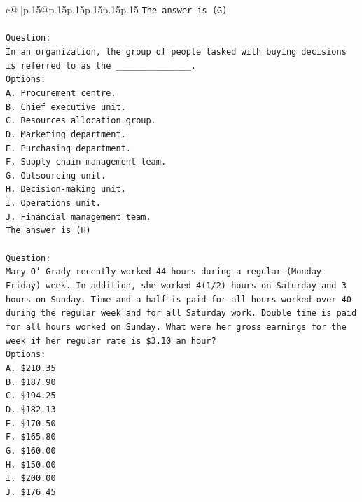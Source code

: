 \documentclass{article}
\begin{document}
{\begin{supertabular}{c@{$\;$}|p{.15\linewidth}@{}p{.15\linewidth}p{.15\linewidth}p{.15\linewidth}p{.15\linewidth}p{.15\linewidth}}
{{{\texttt{The answer is (G)} \\
\\ 
\texttt{Question:} \\
\texttt{In an organization, the group of people tasked with buying decisions is referred to as the \_\_\_\_\_\_\_\_\_\_\_\_\_\_\_.} \\
\texttt{Options:} \\
\texttt{A. Procurement centre.} \\
\texttt{B. Chief executive unit.} \\
\texttt{C. Resources allocation group.} \\
\texttt{D. Marketing department.} \\
\texttt{E. Purchasing department.} \\
\texttt{F. Supply chain management team.} \\
\texttt{G. Outsourcing unit.} \\
\texttt{H. Decision{-}making unit.} \\
\texttt{I. Operations unit.} \\
\texttt{J. Financial management team.} \\
\texttt{The answer is (H)} \\
\\ 
\texttt{Question:} \\
\texttt{Mary O' Grady recently worked 44 hours during a regular (Monday{-}Friday) week. In addition, she worked 4(1/2) hours on Saturday and 3 hours on Sunday. Time and a half is paid for all hours worked over 40 during the regular week and for all Saturday work. Double time is paid for all hours worked on Sunday. What were her gross earnings for the week if her regular rate is \$3.10 an hour?} \\
\texttt{Options:} \\
\texttt{A. \$210.35} \\
\texttt{B. \$187.90} \\
\texttt{C. \$194.25} \\
\texttt{D. \$182.13} \\
\texttt{E. \$170.50} \\
\texttt{F. \$165.80} \\
\texttt{G. \$160.00} \\
\texttt{H. \$150.00} \\
\texttt{I. \$200.00} \\
\texttt{J. \$176.45} \\
            }
        }
    }
     \\ \\


\end{supertabular}}
\end{document}
